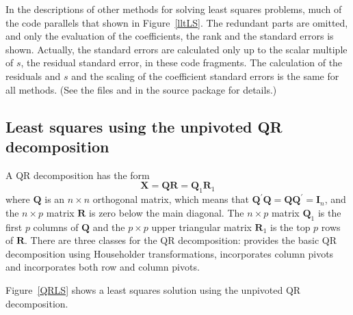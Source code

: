\documentclass[shortnames,article,nojss]{jss}
\begin{document}
In the descriptions of other methods for solving least squares
problems, much of the code parallels that shown in
Figure~\ref{lltLS}.  The redundant parts are omitted, and only
the evaluation of the coefficients, the rank and the standard errors is shown.
Actually, the standard errors are calculated only up to the scalar
multiple of $s$, the residual standard error, in these code fragments.
The calculation of the residuals and $s$ and the scaling of the
coefficient standard errors is the same for all methods.  (See the
files  and  in the 
source package for details.)


\subsection{Least squares using the unpivoted QR decomposition}
\label{sec:QR}

A QR decomposition has the form
\begin{displaymath}
  \bm X=\bm Q\bm R=\bm Q_1\bm R_1
\end{displaymath}
where $\bm Q$ is an $n\times n$ orthogonal matrix, which means that
$\bm Q^\prime\bm Q=\bm Q\bm Q^\prime=\bm I_n$, and the $n\times p$
matrix $\bm R$ is zero below the main diagonal.  The $n\times p$
matrix $\bm Q_1$ is the first $p$ columns of $\bm Q$ and the $p\times
p$ upper triangular matrix $\bm R_1$ is the top $p$ rows of $\bm R$.
There are three  classes for the QR decomposition:
 provides the basic QR decomposition using
Householder transformations,  incorporates
column pivots and  incorporates both row
and column pivots.

Figure~\ref{QRLS} shows a least squares solution using the unpivoted
QR decomposition.
\end{document}
